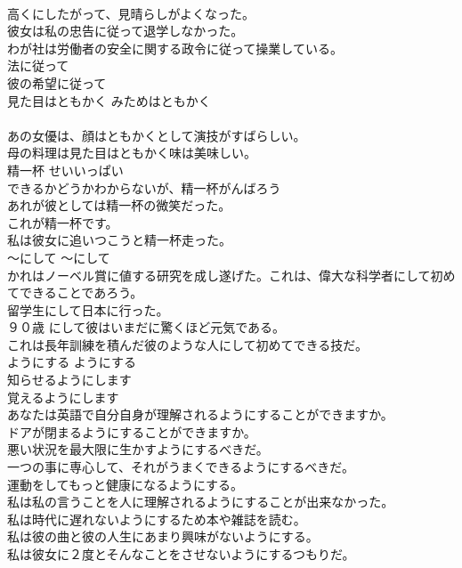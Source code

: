 \documentclass[8pt]{extreport}
\begin{document}
\begin{CJK}{UTF8}{min}
\\	高くにしたがって、見晴らしがよくなった。  
\\	彼女は私の忠告に従って退学しなかった。   
\\	わが社は労働者の安全に関する政令に従って操業している。   
\\	法に従って   
\\	彼の希望に従って   
\\	見た目はともかく	みためはともかく	
\\	[見た目] 
\\	あの女優は、顔はともかくとして演技がすばらしい。  
\\	母の料理は見た目はともかく味は美味しい。  
\\	精一杯	せいいっぱい	
\\	できるかどうかわからないが、精一杯がんばろう  
\\	あれが彼としては精一杯の微笑だった。   
\\	これが精一杯です。  
\\	私は彼女に追いつこうと精一杯走った。 
\\	〜にして	〜にして	
\\	かれはノーベル賞に値する研究を成し遂げた。これは、偉大な科学者にして初めてできることであろう。   
\\	留学生にして日本に行った。  
\\	９０歳 にして彼はいまだに驚くほど元気である。  
\\	これは長年訓練を積んだ彼のような人にして初めてできる技だ。  
\\	ようにする	ようにする	
\\	知らせるようにします  
\\	覚えるようにします  
\\	あなたは英語で自分自身が理解されるようにすることができますか。   
\\	ドアが閉まるようにすることができますか。   
\\	悪い状況を最大限に生かすようにするべきだ。   
\\	一つの事に専心して、それがうまくできるようにするべきだ。   
\\	運動をしてもっと健康になるようにする。   
\\	私は私の言うことを人に理解されるようにすることが出来なかった。   
\\	私は時代に遅れないようにするため本や雑誌を読む。   
\\	私は彼の曲と彼の人生にあまり興味がないようにする。   
\\	私は彼女に２度とそんなことをさせないようにするつもりだ。   

\end{CJK}
\end{document}

